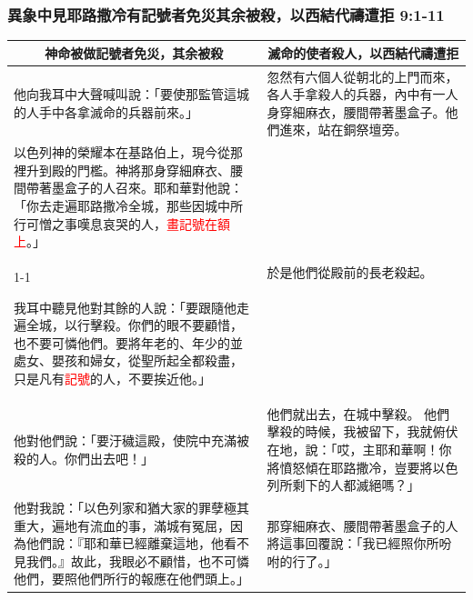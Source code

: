 
\subsubsection{異象中見耶路撒冷有記號者免災其余被殺，以西結代禱遭拒 9:1-11}
\begin{table}[H]
\centering
\begin{tabular}{p{}|p{6.5cm}}\hline\hline
\multicolumn{1}{c|}{神命被做記號者免災，其余被殺}&\multicolumn{1}{c}{滅命的使者殺人，以西結代禱遭拒}\\\hline
他向我耳中大聲喊叫說：「要使那監管這城的人手中各拿滅命的兵器前來。」 
&忽然有六個人從朝北的上門而來，各人手拿殺人的兵器，內中有一人身穿細麻衣，腰間帶著墨盒子。他們進來，站在銅祭壇旁。\\\hline

以色列神的榮耀本在基路伯上，現今從那裡升到殿的門檻。神將那身穿細麻衣、腰間帶著墨盒子的人召來。耶和華對他說：「你去走遍耶路撒冷全城，那些因城中所行可憎之事嘆息哀哭的人，\textcolor{red}{畫記號在額上}。」&\multirow{2}{7.2cm}{於是他們從殿前的長老殺起。}\\\cline{1-1}

我耳中聽見他對其餘的人說：「要跟隨他走遍全城，以行擊殺。你們的眼不要顧惜，也不要可憐他們。要將年老的、年少的並處女、嬰孩和婦女，從聖所起全都殺盡，只是凡有\textcolor{red}{記號}的人，不要挨近他。」&\\\hline

他對他們說：「要汙穢這殿，使院中充滿被殺的人。你們出去吧！」&他們就出去，在城中擊殺。 他們擊殺的時候，我被留下，我就俯伏在地，說：「哎，主耶和華啊！你將憤怒傾在耶路撒冷，豈要將以色列所剩下的人都滅絕嗎？」\\\hline

他對我說：「以色列家和猶大家的罪孽極其重大，遍地有流血的事，滿城有冤屈，因為他們說：『耶和華已經離棄這地，他看不見我們。』故此，我眼必不顧惜，也不可憐他們，要照他們所行的報應在他們頭上。」&那穿細麻衣、腰間帶著墨盒子的人將這事回覆說：「我已經照你所吩咐的行了。」\\\hline
\end{tabular}
\end{table}

